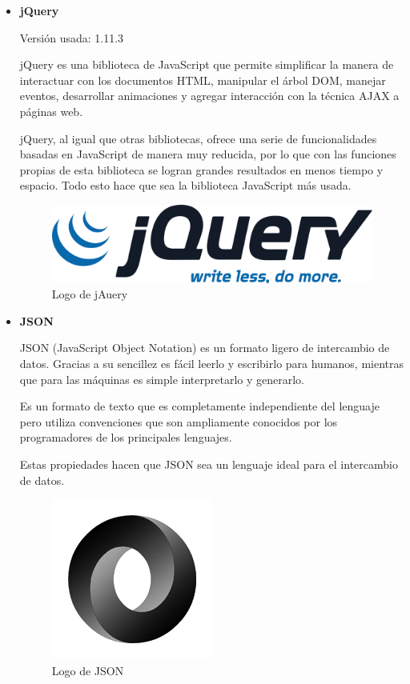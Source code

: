 \begin{itemize}
	\item \textbf{jQuery}
	
		Versión usada: 1.11.3
		
	jQuery \cite{jquery} es una biblioteca de JavaScript que permite simplificar la manera de interactuar con los documentos HTML, manipular el árbol DOM, manejar eventos, desarrollar animaciones y agregar interacción con la técnica AJAX a páginas web.

	jQuery, al igual que otras bibliotecas, ofrece una serie de funcionalidades basadas en JavaScript de manera muy reducida, por lo que con las funciones propias de esta biblioteca se logran grandes resultados en menos tiempo y espacio. Todo esto hace que sea la biblioteca JavaScript más usada.
		
	\bigskip
	\begin{figure}[h]
		\centering
		\includegraphics[width=0.4\linewidth]{../images/jquerylogo}
		\caption[Logo de jQuery]{Logo de jAuery}
		\label{fig:jquerylogo}
	\end{figure}
		
	\item \textbf{JSON}
		
	JSON (JavaScript Object Notation) \cite{json} es un formato ligero de intercambio de datos. Gracias a su sencillez es fácil leerlo y escribirlo para humanos, mientras que para las máquinas es simple interpretarlo y generarlo.
	
	Es un formato de texto que es completamente independiente del lenguaje pero utiliza convenciones que son ampliamente conocidos por los programadores de los principales lenguajes. 
	
	Estas propiedades hacen que JSON sea un lenguaje ideal para el intercambio de datos.

	\bigskip
	\begin{figure}[h]
		\centering
		\includegraphics[width=0.3\linewidth]{../images/jsonlogo}
		\caption[Logo de JSON]{Logo de JSON}
		\label{fig:jsonlogo}
	\end{figure}
	

\end{itemize}

